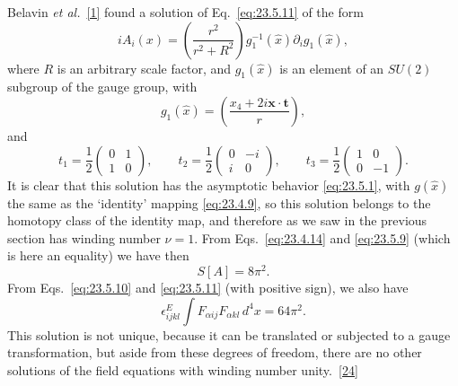 Belavin \emph{et al.}~\hyperref[ch23-ref-1]{[1]} found a solution of
Eq.~\eqref{eq:23.5.11} of the form
\begin{equation}
iA_i(x)=\left(\frac{r^2}{r^2+R^2}\right)
g_1^{-1}(\widehat x)\partial_i g_1(\widehat x),
\tag{23.5.12}\label{eq:23.5.12}
\end{equation}
where $R$ is an arbitrary scale factor, and $g_1(\widehat x)$ is an
element of an $SU(2)$ subgroup of the gauge group, with
\begin{equation}
g_1(\widehat x)=\left(\frac{x_4+2i\mathbf x\cdot\mathbf t}{r}\right),
\tag{23.5.13}\label{eq:23.5.13}
\end{equation}
and
\begin{equation}
t_1=\frac12\begin{pmatrix}0&1\\1&0\end{pmatrix},
\qquad
t_2=\frac12\begin{pmatrix}0&-i\\i&0\end{pmatrix},
\qquad
t_3=\frac12\begin{pmatrix}1&0\\0&-1\end{pmatrix}.
\tag{23.5.14}\label{eq:23.5.14}
\end{equation}
It is clear that this solution has the asymptotic behavior
\eqref{eq:23.5.1}, with $g(\widehat x)$ the same as the `identity'
mapping \eqref{eq:23.4.9}, so this solution belongs to the homotopy class
of the identity map, and therefore as we saw in the previous section has
winding number $\nu=1$. From Eqs.~\eqref{eq:23.4.14} and
\eqref{eq:23.5.9} (which is here an equality) we have then
\begin{equation}
S[A]=8\pi^2.
\tag{23.5.15}\label{eq:23.5.15}
\end{equation}
From Eqs.~\eqref{eq:23.5.10} and \eqref{eq:23.5.11} (with positive
sign), we also have
\begin{equation}
\epsilon^E_{ijkl}\int F_{\alpha ij}F_{\alpha kl}\,d^4x=64\pi^2.
\tag{23.5.16}\label{eq:23.5.16}
\end{equation}
This solution is not unique, because it can be translated or subjected
to a gauge transformation, but aside from these degrees of freedom,
there are no other solutions of the field equations with winding number
unity.~\hyperref[ch23-ref-24]{[24]}

